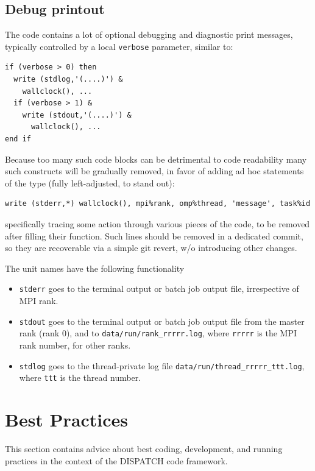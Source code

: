 \documentclass[paper=a4,fontsize=11pt]{scrartcl}
\numberwithin{equation}{section}		%
\numberwithin{figure}{section}			%
\numberwithin{table}{section}				%
\newcommand{\codecolor}{\color{Blue}}
\newcommand{\filecolor}{\color{NavyBlue}}
\newcommand{\File}[1]{{\filecolor\texttt{#1}}}
\newcommand{\Code}[1]{{\codecolor\texttt{#1}}}
\begin{document}
\subsection{Debug printout}
The code  contains a lot of optional debugging and diagnostic print messages, typically controlled by a local \Code{verbose} parameter, similar to:
{\codecolor\begin{verbatim}
if (verbose > 0) then
  write (stdlog,'(....)') &
    wallclock(), ...
  if (verbose > 1) &
    write (stdout,'(....)') &
      wallclock(), ...
end if
\end{verbatim}}

Because too many such code blocks can be detrimental to code readability many such constructs will be gradually removed, in favor of adding ad hoc statements of the type (fully left-adjusted, to stand out):
{\codecolor\begin{verbatim}
write (stderr,*) wallclock(), mpi%rank, omp%thread, 'message', task%id
\end{verbatim}}
specifically tracing some action through various pieces of the code, to be removed after filling their function. Such lines should be removed in a dedicated commit, so they are recoverable via a simple git revert, w/o introducing other changes.

The unit names have the following functionality
\begin{itemize}
    \item \Code{stderr} goes to the terminal output or batch job output file, irrespective of MPI rank.
    \item \Code{stdout} goes to the terminal output or batch job output file from the master rank (rank 0), and to \File{data/run/rank\_rrrrr.log}, where \File{rrrrr} is the MPI rank number, for other ranks.
    \item \Code{stdlog} goes to the thread-private log file \File{data/run/thread\_rrrrr\_ttt.log}, where \File{ttt} is the thread number.
\end{itemize}

\section{Best Practices}
This section contains advice about best coding, development, and running practices in the context of the DISPATCH code framework.

\end{document}
